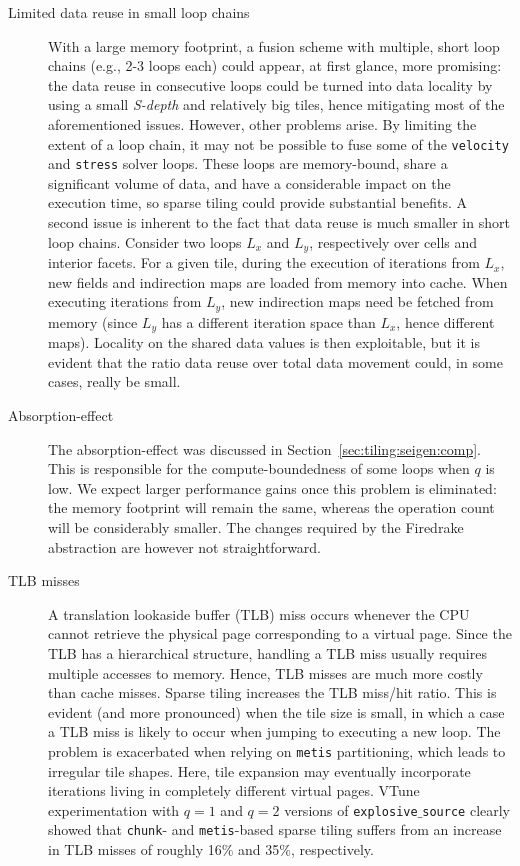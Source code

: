 \begin{description}
\item[Limited data reuse in small loop chains] With a large memory footprint, a fusion scheme with multiple, short loop chains (e.g., 2-3 loops each) could appear, at first glance, more promising: the data reuse in consecutive loops could be turned into data locality by using a small {\em S-depth} and relatively big tiles, hence mitigating most of the aforementioned issues. However, other problems arise. By limiting the extent of a loop chain, it may not be possible to fuse some of the {\tt velocity} and {\tt stress} solver loops. These loops are memory-bound, share a significant volume of data, and have a considerable impact on the execution time, so sparse tiling could provide substantial benefits. A second issue is inherent to the fact that data reuse is much smaller in short loop chains. Consider two loops $L_x$ and $L_y$, respectively over cells and interior facets. For a given tile, during the execution of iterations from $L_x$, new fields and indirection maps are loaded from memory into cache. When executing iterations from $L_y$, new indirection maps need be fetched from memory (since $L_y$ has a different iteration space than $L_x$, hence different maps). Locality on the shared data values is then exploitable, but it is evident that the ratio data reuse over total data movement could, in some cases, really be small.

\item[Absorption-effect] The absorption-effect was discussed in Section~\ref{sec:tiling:seigen:comp}. This is responsible for the compute-boundedness of some loops when $q$ is low. We expect larger performance gains once this problem is eliminated: the memory footprint will remain the same, whereas the operation count will be considerably smaller. The changes required by the Firedrake abstraction are however not straightforward.

\item[TLB misses] A translation lookaside buffer (TLB) miss occurs whenever the CPU cannot retrieve the physical page corresponding to a virtual page. Since the TLB has a hierarchical structure, handling a TLB miss usually requires multiple accesses to memory. Hence, TLB misses are much more costly than cache misses. Sparse tiling increases the TLB miss/hit ratio. This is evident (and more pronounced) when the tile size is small, in which a case a TLB miss is likely to occur when jumping to executing a new loop. The problem is exacerbated when relying on {\tt metis} partitioning, which leads to irregular tile shapes. Here, tile expansion may eventually incorporate iterations living in completely different virtual pages. VTune experimentation with $q=1$ and $q=2$ versions of {\tt explosive$\_$source} clearly showed that {\tt chunk}- and {\tt metis}-based sparse tiling suffers from an increase in TLB misses of roughly 16$\%$ and 35$\%$, respectively.
\end{description}

